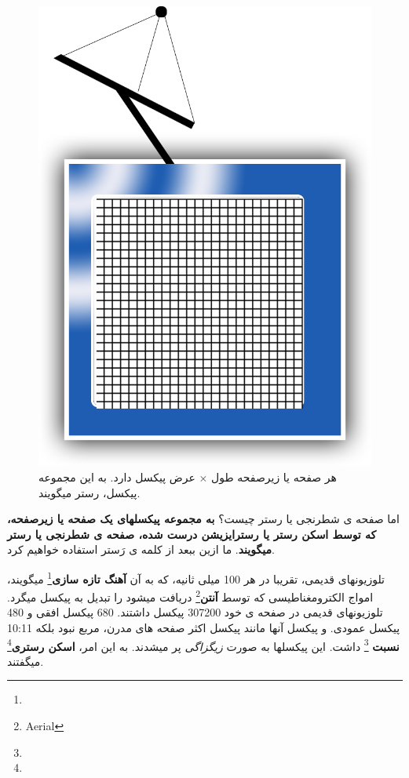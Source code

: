\documentclass[14pt,a4paper]{memoir}
\begin{document}
	  
	  \begin{figure}[H]
	  	\centering
	  	\includegraphics[scale=0.4]{TV}
	  	\caption{هر صفحه یا زیرصفحه طول $ \times $ عرض پیکسل دارد. به این مجموعه پیکسل، رستر میگویند.}
	  \end{figure}


اما صفحه ی شطرنجی یا رستر چیست؟ \textbf{به مجموعه پیکسلهای یک صفحه یا زیرصفحه، که توسط اسکن رستر یا رسترایزیشن درست شده، صفحه ی شطرنجی یا رستر میگویند}. ما ازین ببعد از کلمه ی رَستر استفاده خواهیم کرد.



 تلوزیونهای قدیمی، تقریبا در هر 100 میلی ثانیه، که به آن \textbf{آهنگ تازه سازی}\footnote{} میگویند، امواج الکترومغناطیسی که توسط \textbf{آنتن}\footnote{Aerial} دریافت میشود را تبدیل به پیکسل میگرد. تلوزیونهای قدیمی در صفحه ی خود 307200 پیکسل داشتند. 680 پیکسل افقی و 480 پیکسل عمودی. و پیکسل آنها مانند پیکسل اکثر صفحه های مدرن، مربع نبود بلکه 10:11 \textbf{نسبت }\footnote{} داشت. این پیکسلها به صورت \textit{زیگزاگی} پر میشدند. به این امر، \textbf{اسکن رستری}\footnote{} میگفتند.
 
\end{document}
